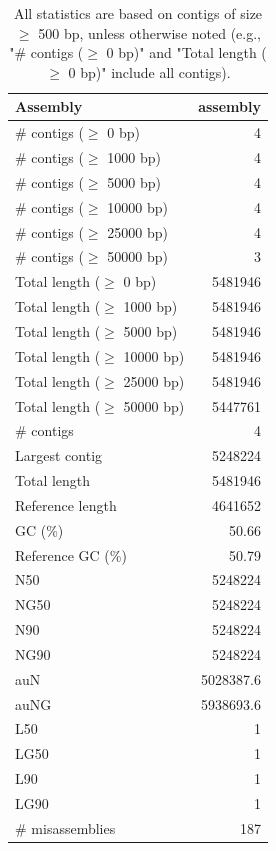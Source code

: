\documentclass[12pt,a4paper]{article}
\begin{document}
\begin{table}[ht]
\begin{center}
\caption{All statistics are based on contigs of size $\geq$ 500 bp, unless otherwise noted (e.g., "\# contigs ($\geq$ 0 bp)" and "Total length ($\geq$ 0 bp)" include all contigs).}
\begin{tabular}{|l*{1}{|r}|}
\hline
Assembly & assembly \\ \hline
\# contigs ($\geq$ 0 bp) & 4 \\ \hline
\# contigs ($\geq$ 1000 bp) & 4 \\ \hline
\# contigs ($\geq$ 5000 bp) & 4 \\ \hline
\# contigs ($\geq$ 10000 bp) & 4 \\ \hline
\# contigs ($\geq$ 25000 bp) & 4 \\ \hline
\# contigs ($\geq$ 50000 bp) & 3 \\ \hline
Total length ($\geq$ 0 bp) & 5481946 \\ \hline
Total length ($\geq$ 1000 bp) & 5481946 \\ \hline
Total length ($\geq$ 5000 bp) & 5481946 \\ \hline
Total length ($\geq$ 10000 bp) & 5481946 \\ \hline
Total length ($\geq$ 25000 bp) & 5481946 \\ \hline
Total length ($\geq$ 50000 bp) & 5447761 \\ \hline
\# contigs & 4 \\ \hline
Largest contig & 5248224 \\ \hline
Total length & 5481946 \\ \hline
Reference length & 4641652 \\ \hline
GC (\%) & 50.66 \\ \hline
Reference GC (\%) & 50.79 \\ \hline
N50 & 5248224 \\ \hline
NG50 & 5248224 \\ \hline
N90 & 5248224 \\ \hline
NG90 & 5248224 \\ \hline
auN & 5028387.6 \\ \hline
auNG & 5938693.6 \\ \hline
L50 & 1 \\ \hline
LG50 & 1 \\ \hline
L90 & 1 \\ \hline
LG90 & 1 \\ \hline
\# misassemblies & 187 \\ \hline

\end{tabular}
\end{center}
\end{table}
\end{document}

